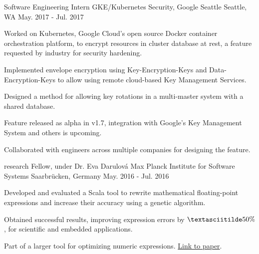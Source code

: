 
\vspace{-0.2cm}


\begin{cventries}


  \cventry
  {Software Engineering Intern}
  {GKE/Kubernetes Security, Google Seattle}
  {Seattle, WA}
  {May. 2017 - Jul. 2017}
  {
    \begin{cvitems}
    \item {Worked on Kubernetes, Google Cloud's open source Docker container orchestration platform, to encrypt resources in cluster database at rest, a feature requested by industry for security hardening.}
    \item {Implemented envelope encryption using Key-Encryption-Keys and Data-Encryption-Keys to allow using remote cloud-based Key Management Services.}
    \item {Designed a method for allowing key rotations in a multi-master system with a shared database.}
    \item {Feature released as alpha in v1.7, integration with Google's Key Management System and others is upcoming.}
    \item {Collaborated with engineers across multiple companies for designing the feature.}
    \end{cvitems}
  }

  \cventry
  {research Fellow, under Dr. Eva Darulová} %
  {Max Planck Institute for Software Systems} %
  {Saarbrücken, Germany} %
  {May. 2016 - Jul. 2016} %
  {
    \begin{cvitems}
    \item {Developed and evaluated a Scala tool to rewrite
    mathematical floating-point expressions and increase their
    accuracy using a genetic algorithm.}
    \item {Obtained successful results, improving expression errors by
    $\textasciitilde50\%$, for scientific and embedded
    applications.}
    \item {Part of a larger tool for optimizing numeric expressions. \href{https://arxiv.org/abs/1707.02118}{Link to paper}}.
    \end{cvitems}
  }


\end{cventries}
